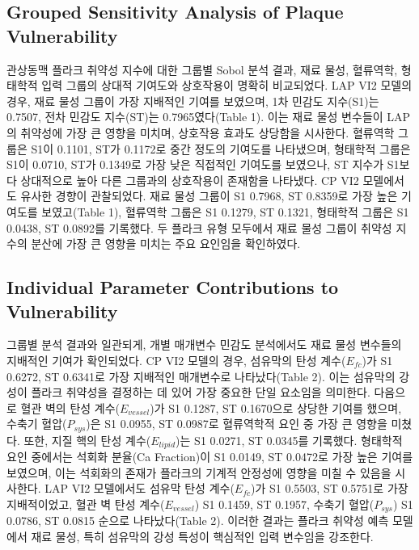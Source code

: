 \documentclass[preprint,12pt]{elsarticle}
\begin{document}
\subsection{Grouped Sensitivity Analysis of Plaque Vulnerability}
관상동맥 플라크 취약성 지수에 대한 그룹별 Sobol 분석 결과, 재료 물성, 혈류역학, 형태학적 입력 그룹의 상대적 기여도와 상호작용이 명확히 비교되었다. LAP VI2 모델의 경우, 재료 물성 그룹이 가장 지배적인 기여를 보였으며, 1차 민감도 지수(S1)는 0.7507, 전차 민감도 지수(ST)는 0.7965였다(Table 1). 이는 재료 물성 변수들이 LAP의 취약성에 가장 큰 영향을 미치며, 상호작용 효과도 상당함을 시사한다. 혈류역학 그룹은 S1이 0.1101, ST가 0.1172로 중간 정도의 기여도를 나타냈으며, 형태학적 그룹은 S1이 0.0710, ST가 0.1349로 가장 낮은 직접적인 기여도를 보였으나, ST 지수가 S1보다 상대적으로 높아 다른 그룹과의 상호작용이 존재함을 나타냈다. CP VI2 모델에서도 유사한 경향이 관찰되었다. 재료 물성 그룹이 S1 0.7968, ST 0.8359로 가장 높은 기여도를 보였고(Table 1), 혈류역학 그룹은 S1 0.1279, ST 0.1321, 형태학적 그룹은 S1 0.0438, ST 0.0892를 기록했다. 두 플라크 유형 모두에서 재료 물성 그룹이 취약성 지수의 분산에 가장 큰 영향을 미치는 주요 요인임을 확인하였다.

\subsection{Individual Parameter Contributions to Vulnerability}
그룹별 분석 결과와 일관되게, 개별 매개변수 민감도 분석에서도 재료 물성 변수들의 지배적인 기여가 확인되었다. CP VI2 모델의 경우, 섬유막의 탄성 계수($E_{fc}$)가 S1 0.6272, ST 0.6341로 가장 지배적인 매개변수로 나타났다(Table 2). 이는 섬유막의 강성이 플라크 취약성을 결정하는 데 있어 가장 중요한 단일 요소임을 의미한다. 다음으로 혈관 벽의 탄성 계수($E_{vessel}$)가 S1 0.1287, ST 0.1670으로 상당한 기여를 했으며, 수축기 혈압($P_{sys}$)은 S1 0.0955, ST 0.0987로 혈류역학적 요인 중 가장 큰 영향을 미쳤다. 또한, 지질 핵의 탄성 계수($E_{lipid}$)는 S1 0.0271, ST 0.0345를 기록했다. 형태학적 요인 중에서는 석회화 분율(Ca Fraction)이 S1 0.0149, ST 0.0472로 가장 높은 기여를 보였으며, 이는 석회화의 존재가 플라크의 기계적 안정성에 영향을 미칠 수 있음을 시사한다. LAP VI2 모델에서도 섬유막 탄성 계수($E_{fc}$)가 S1 0.5503, ST 0.5751로 가장 지배적이었고, 혈관 벽 탄성 계수($E_{vessel}$) S1 0.1459, ST 0.1957, 수축기 혈압($P_{sys}$) S1 0.0786, ST 0.0815 순으로 나타났다(Table 2). 이러한 결과는 플라크 취약성 예측 모델에서 재료 물성, 특히 섬유막의 강성 특성이 핵심적인 입력 변수임을 강조한다.
\end{document}
